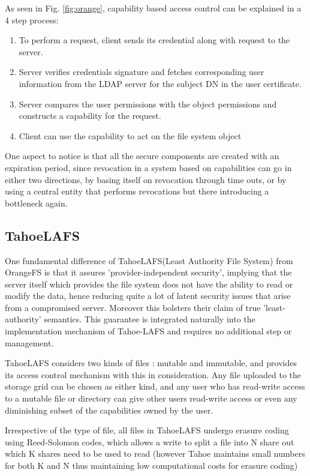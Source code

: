 As seen in Fig. \ref{fig:orange}, capability based access control can be explained in a 4 step process:
\begin{enumerate}
\item To perform a request, client sends its credential along with request to the server.
\item Server verifies credentials signature and fetches corresponding user information from the LDAP server for the subject DN in the user certificate. 
\item Server compares the user permissions with the object permissions and constructs a capability for the request.
\item Client can use the capability to act on the file system object
\end{enumerate}
One aspect to notice is that all the secure components are created with an expiration period, since revocation in a system based on capabilities can go in either two directions, by basing itself on revocation through time outs, or by using a central entity that performs revocations but there introducing a bottleneck again.

\subsection{TahoeLAFS}
One fundamental difference of TahoeLAFS(Least Authority File System) from OrangeFS is that it assures 'provider-independent security', implying that the server itself which provides the file system does not have the ability to read or modify the data, hence reducing quite a lot of latent security issues that arise from a compromised server. Moreover this bolsters their claim of true 'least-authority' semantics. This guarantee is integrated naturally into the implementation mechanism of Tahoe-LAFS and requires no additional step or management. 

TahoeLAFS\cite{tahoelafs} considers two kinds of files : mutable and immutable, and provides its access control mechanism with this in consideration. Any file uploaded to the storage grid can be chosen as either kind, and any user who has read-write access to a mutable file or directory can give other users read-write access or even any diminishing subset of the capabilities owned by the user. 

Irrespective of the type of file, all files in TahoeLAFS undergo erasure coding using Reed-Solomon codes, which allows a write to split a file into N share out which K shares need to be used to read (however Tahoe maintains small numbers for both K and N thus maintaining low computational costs for erasure coding)

